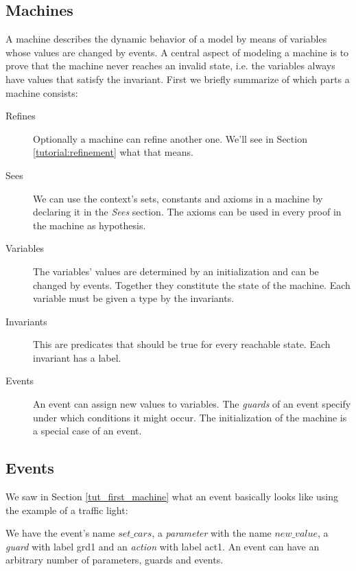 \subsection{Machines}
\label{tut_machines}

A machine describes the dynamic behavior of a model by means of
variables whose values are changed by events.
A central aspect of modeling a machine is to prove that the machine
never reaches an invalid state, i.e. the variables always have values
that satisfy the invariant.
First we briefly summarize of which parts a machine consists:

\begin{description}
\item[Refines]  Optionally a machine can refine another one.
  We'll see in Section \ref{tutorial:refinement} what that means.
\item[Sees]  We can use the context's sets, constants and axioms  in
  a machine by declaring it in the \textsl{Sees} section.
  The axioms can be used in every proof in the machine as hypothesis.
\item[Variables] 
  The variables' values are determined by an initialization and
  can be changed by events. Together they constitute the state
  of the machine.
  Each variable must be given a type by the invariants.
\item[Invariants] 
  This are predicates that should be true for every reachable state.
  Each invariant has a label.
\item[Events] 
  An event can assign new values to variables.
  The \emph{guards} of an event specify under which conditions it might occur.
  The initialization of the machine is a special case of an event.
\end{description}

\subsection{Events}
\label{tut_events}

We saw in Section \ref{tut_first_machine} what an event basically looks like using the example of a traffic light:
\begin{description}
		\begin{description}
		\AnyPrm
			\begin{description}
			\end{description}
		\WhereGrd
			\begin{description}
			\nItemX{ grd1 }{ new\_value \in  BOOL }
			\end{description}
		\ThenAct
			\begin{description}
			\nItemX{ act1 }{ cars\_go :=  new\_value }
			\end{description}
		\EndAct
		\end{description}
\end{description}
We have the event's name $set\_cars$, a \emph{parameter} with the name $new\_value$,
a \emph{guard} with label grd1 and an \emph{action} with label act1.
An event can have an arbitrary number of parameters, guards and events.

